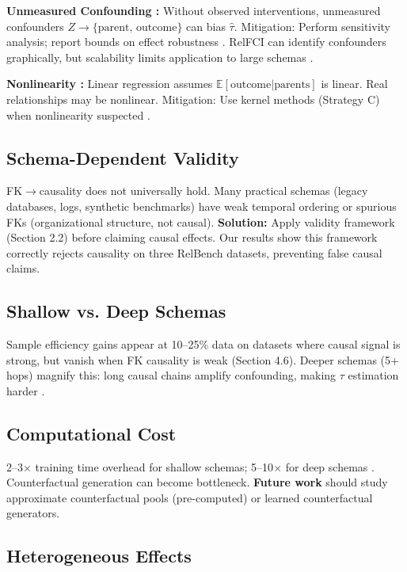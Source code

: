 \documentclass[11pt,letterpaper]{article}
\begin{document}
\textbf{Unmeasured Confounding \cite{VanderWeele2013}:} Without observed interventions, unmeasured confounders $Z \rightarrow \{\text{parent, outcome}\}$ can bias $\hat{\tau}$. Mitigation: Perform sensitivity analysis; report bounds on effect robustness \cite{VanderWeele2013}. RelFCI can identify confounders graphically, but scalability limits application to large schemas \cite{Negro2025}.

\textbf{Nonlinearity \cite{Schoelkopf2020}:} Linear regression assumes $\mathbb{E}[\text{outcome}|\text{parents}]$ is linear. Real relationships may be nonlinear. Mitigation: Use kernel methods (Strategy C) when nonlinearity suspected \cite{Schoelkopf2020}.

\subsection{Schema-Dependent Validity}

FK$\rightarrow$causality does not universally hold. Many practical schemas (legacy databases, logs, synthetic benchmarks) have weak temporal ordering or spurious FKs (organizational structure, not causal). \textbf{Solution:} Apply validity framework (Section 2.2) before claiming causal effects. Our results show this framework correctly rejects causality on three RelBench datasets, preventing false causal claims.

\subsection{Shallow vs. Deep Schemas}

Sample efficiency gains appear at 10--25\% data on datasets where causal signal is strong, but vanish when FK causality is weak (Section 4.6). Deeper schemas (5+ hops) magnify this: long causal chains amplify confounding, making $\tau$ estimation harder \cite{Negro2025}.

\subsection{Computational Cost}

2--3$\times$ training time overhead for shallow schemas; 5--10$\times$ for deep schemas \cite{Li2023}. Counterfactual generation can become bottleneck. \textbf{Future work} should study approximate counterfactual pools (pre-computed) or learned counterfactual generators.

\subsection{Heterogeneous Effects}
\end{document}
